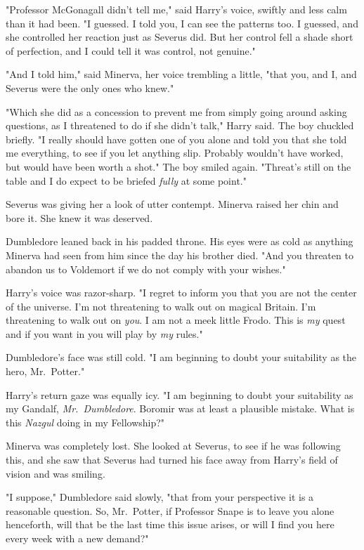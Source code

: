 "Professor McGonagall didn't tell me," said Harry's voice, swiftly and less
calm than it had been. "I guessed. I told you, I can see the patterns too. I
guessed, and she controlled her reaction just as Severus did. But her control
fell a shade short of perfection, and I could tell it was control, not genuine."

"And I told him," said Minerva, her voice trembling a little, "that you, and I,
and Severus were the only ones who knew."

"Which she did as a concession to prevent me from simply going around asking
questions, as I threatened to do if she didn't talk," Harry said. The boy
chuckled briefly. "I really should have gotten one of you alone and told you
that she told me everything, to see if you let anything slip. Probably wouldn't
have worked, but would have been worth a shot." The boy smiled again. "Threat's
still on the table and I do expect to be briefed \emph{fully} at some point."

Severus was giving her a look of utter contempt. Minerva raised her chin and
bore it. She knew it was deserved.

Dumbledore leaned back in his padded throne. His eyes were as cold as anything
Minerva had seen from him since the day his brother died. "And you threaten to
abandon us to Voldemort if we do not comply with your wishes."

Harry's voice was razor-sharp. "I regret to inform you that you are not the
center of the universe. I'm not threatening to walk out on magical Britain. I'm
threatening to walk out on \emph{you}. I am not a meek little Frodo. This is
\emph{my} quest and if you want in you will play by \emph{my} rules."

Dumbledore's face was still cold. "I am beginning to doubt your suitability as
the hero, Mr.~Potter."

Harry's return gaze was equally icy. "I am beginning to doubt your suitability
as my Gandalf, \emph{Mr.~Dumbledore}. Boromir was at least a plausible mistake.
What is this \emph{Nazgul} doing in my Fellowship?"

Minerva was completely lost. She looked at Severus, to see if he was following
this, and she saw that Severus had turned his face away from Harry's field of
vision and was smiling.

"I suppose," Dumbledore said slowly, "that from your perspective it is a
reasonable question. So, Mr.~Potter, if Professor Snape is to leave you alone
henceforth, will that be the last time this issue arises, or will I find you
here every week with a new demand?"


